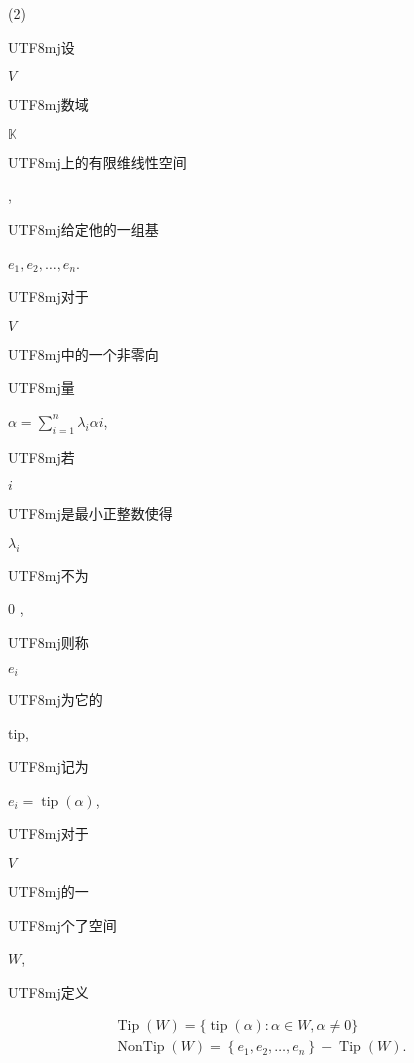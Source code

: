 \documentclass[10pt]{article}
\begin{document}
(2) \begin{CJK}{UTF8}{mj}设\end{CJK} $V$ \begin{CJK}{UTF8}{mj}数域\end{CJK} $\mathbb{K}$ \begin{CJK}{UTF8}{mj}上的有限维线性空间\end{CJK}, \begin{CJK}{UTF8}{mj}给定他的一组基\end{CJK} $e_{1}, e_{2}, \ldots, e_{n}$. \begin{CJK}{UTF8}{mj}对于\end{CJK} $V$ \begin{CJK}{UTF8}{mj}中的一个非零向\end{CJK} \begin{CJK}{UTF8}{mj}量\end{CJK} $\alpha=\sum_{i=1}^{n} \lambda_{i} \alpha i$, \begin{CJK}{UTF8}{mj}若\end{CJK} $i$ \begin{CJK}{UTF8}{mj}是最小正整数使得\end{CJK} $\lambda_{i}$ \begin{CJK}{UTF8}{mj}不为\end{CJK} 0 , \begin{CJK}{UTF8}{mj}则称\end{CJK} $e_{i}$ \begin{CJK}{UTF8}{mj}为它的\end{CJK} tip, \begin{CJK}{UTF8}{mj}记为\end{CJK} $e_{i}=\operatorname{tip}(\alpha)$, \begin{CJK}{UTF8}{mj}对于\end{CJK} $V$ \begin{CJK}{UTF8}{mj}的一\end{CJK} \begin{CJK}{UTF8}{mj}个了空间\end{CJK} $W$, \begin{CJK}{UTF8}{mj}定义\end{CJK}
$$
\begin{gathered}
\operatorname{Tip}(W)=\{\operatorname{tip}(\alpha): \alpha \in W, \alpha \neq 0\} \\
\operatorname{NonTip}(W)=\left\{e_{1}, e_{2}, \ldots, e_{n}\right\}-\operatorname{Tip}(W) .
\end{gathered}
$$
\end{document}
